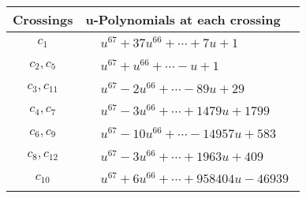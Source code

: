 \documentclass[1p]{elsarticle_modified}
\theoremstyle{definition}
\begin{document}
\begin{tabular}{m{50pt}|m{274pt}}
Crossings & \hspace{64pt}u-Polynomials at each crossing \\
\hline $$\begin{aligned}c_{1}\end{aligned}$$&$\begin{aligned}
&u^{67}+37 u^{66}+\cdots+7 u+1
\end{aligned}$\\
\hline $$\begin{aligned}c_{2},c_{5}\end{aligned}$$&$\begin{aligned}
&u^{67}+u^{66}+\cdots- u+1
\end{aligned}$\\
\hline $$\begin{aligned}c_{3},c_{11}\end{aligned}$$&$\begin{aligned}
&u^{67}-2 u^{66}+\cdots-89 u+29
\end{aligned}$\\
\hline $$\begin{aligned}c_{4},c_{7}\end{aligned}$$&$\begin{aligned}
&u^{67}-3 u^{66}+\cdots+1479 u+1799
\end{aligned}$\\
\hline $$\begin{aligned}c_{6},c_{9}\end{aligned}$$&$\begin{aligned}
&u^{67}-10 u^{66}+\cdots-14957 u+583
\end{aligned}$\\
\hline $$\begin{aligned}c_{8},c_{12}\end{aligned}$$&$\begin{aligned}
&u^{67}-3 u^{66}+\cdots+1963 u+409
\end{aligned}$\\
\hline $$\begin{aligned}c_{10}\end{aligned}$$&$\begin{aligned}
&u^{67}+6 u^{66}+\cdots+958404 u-46939
\end{aligned}$\\
\hline
\end{tabular}\\~\\
\newpage\renewcommand{\arraystretch}{1}
\end{document}
